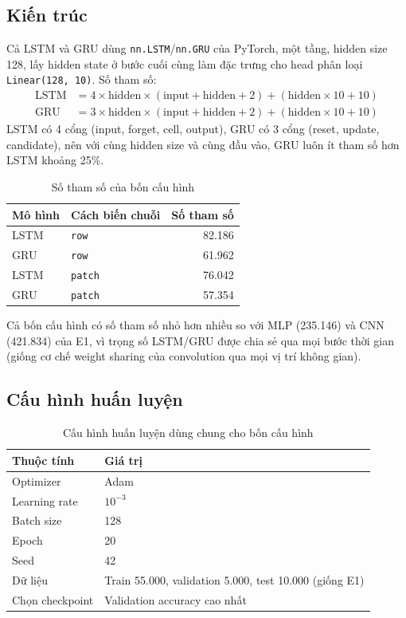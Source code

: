 \documentclass[12pt,a4paper]{article}
\begin{document}
\subsection{Kiến trúc}

Cả LSTM và GRU dùng \texttt{nn.LSTM}/\texttt{nn.GRU} của PyTorch, một tầng, hidden
size 128, lấy hidden state ở bước cuối cùng làm đặc trưng cho head phân loại
\texttt{Linear(128, 10)}. Số tham số:
\begin{align*}
\text{LSTM} &= 4 \times \text{hidden} \times (\text{input} + \text{hidden} + 2) + (\text{hidden} \times 10 + 10) \\
\text{GRU} &= 3 \times \text{hidden} \times (\text{input} + \text{hidden} + 2) + (\text{hidden} \times 10 + 10)
\end{align*}
LSTM có 4 cổng (input, forget, cell, output), GRU có 3 cổng (reset, update,
candidate), nên với cùng hidden size và cùng đầu vào, GRU luôn ít tham số hơn
LSTM khoảng 25\%.

\begin{table}[H]
\centering
\caption{Số tham số của bốn cấu hình}
\begin{tabular}{llr}
\toprule
Mô hình & Cách biến chuỗi & Số tham số \\
\midrule
LSTM & \texttt{row} & 82.186 \\
GRU & \texttt{row} & 61.962 \\
LSTM & \texttt{patch} & 76.042 \\
GRU & \texttt{patch} & 57.354 \\
\bottomrule
\end{tabular}
\end{table}

Cả bốn cấu hình có số tham số nhỏ hơn nhiều so với MLP (235.146) và CNN
(421.834) của E1, vì trọng số LSTM/GRU được chia sẻ qua mọi bước thời gian
(giống cơ chế weight sharing của convolution qua mọi vị trí không gian).

\subsection{Cấu hình huấn luyện}

\begin{table}[H]
\centering
\caption{Cấu hình huấn luyện dùng chung cho bốn cấu hình}
\begin{tabular}{ll}
\toprule
Thuộc tính & Giá trị \\
\midrule
Optimizer & Adam \\
Learning rate & $10^{-3}$ \\
Batch size & 128 \\
Epoch & 20 \\
Seed & 42 \\
Dữ liệu & Train 55.000, validation 5.000, test 10.000 (giống E1) \\
Chọn checkpoint & Validation accuracy cao nhất \\
\bottomrule
\end{tabular}
\end{table}
\end{document}
